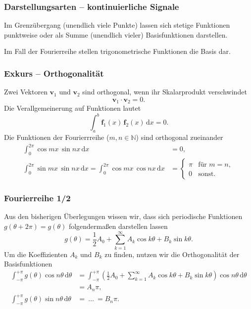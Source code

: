 \documentclass[hyperref={pdfpagemode=FullScreen, colorlinks=false}]{beamer}
\begin{document}
\begin{frame}
\frametitle{Darstellungsarten {\normalsize -- kontinuierliche Signale}}
Im Grenzübergang (unendlich viele Punkte) lassen sich stetige Funktionen punktweise oder als Summe (unendlich vieler) Basisfunktionen darstellen.

\bigskip



\bigskip

Im Fall der Fourierreihe stellen trigonometrische Funktionen die Basis dar.
\end{frame}

\begin{frame}
\frametitle{Exkurs -- Orthogonalität}
Zwei Vektoren $\mathbf{v}_1$ und $\mathbf{v}_2$ sind orthogonal, 
wenn ihr Skalarprodukt verschwindet
\begin{equation*}
\mathbf{v}_1  \cdot \mathbf{v}_2 =0 .
\end{equation*}
Die Verallgemeinerung auf Funktionen lautet
\begin{equation*}
\int_{a}^{b} \mathbf{f}_1(x)\,\mathbf{f}_2(x)\,\mathrm{d}x =0 .
\end{equation*}
Die Funktionen der Fourierrreihe ($m,n \in \mathbb{N}$) sind orthogonal zueinander
\begin{align*}
\int_{0}^{2\pi} \cos mx\, \sin nx\,\mathrm{d}x &=0,\\
\int_{0}^{2\pi} \sin mx\, \sin nx\,\mathrm{d}x=\int_{0}^{2\pi} \cos mx\, \cos nx\,\mathrm{d}x &=
\left\{\begin{array}{ll}
\pi & \text{für } m=n,\\
0 & \text{sonst}.
\end{array}
 \right.
\end{align*}
\end{frame}

\begin{frame}
\frametitle{Fourierreihe 1/2}
Aus den bisherigen Überlegungen wissen wir, dass sich periodische Funktionen $g(\theta+2\pi)=g(\theta)$ folgendermaßen darstellen lassen
\begin{equation*}
 g(\theta)=\frac{1}{2}A_0 + \sum_{k=1}^{\infty} A_k \cos k\theta + B_k \sin k\theta.
\end{equation*}
Um die Koeffizienten $A_k$ und $B_k$ zu finden, 
nutzen wir die Orthogonalität der Basisfunktionen
\begin{align*}
\int_{-\pi}^{+\pi} g(\theta) \cos n\theta\,\mathrm{d}\theta 
&=\int_{-\pi}^{+\pi} \left(\frac{1}{2}A_0 + \sum_{k=1}^{\infty} A_k \cos k\theta + B_k \sin k\theta\right)  \cos n\theta \,\mathrm{d}\theta \\
&= A_n \pi,\\
\int_{-\pi}^{+\pi} g(\theta) \sin n\theta\,\mathrm{d}\theta 
&=\ \dots \ =B_n \pi.
\end{align*} 

\end{frame}
\end{document}
